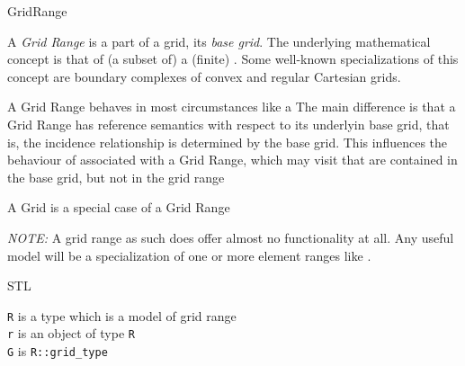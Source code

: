 \begin{Label}{GridRange}  
\end{Label}

    A {\em  Grid Range} is a part of a grid, its {\em  base grid}.
    The underlying mathematical concept
    is that of (a subset of) a (finite) 
    .
    Some well-known specializations of this concept are
    boundary complexes of convex 
    and regular Cartesian grids.

    A Grid Range behaves in most circumstances like a 
    The main difference is that a Grid Range has reference semantics with respect to
    its underlyin base grid, that is, the incidence relationship is determined by the 
    base grid.
    This influences the behaviour of
    associated with a Grid Range,
    which may  visit 
    that are contained in the base grid,
    but not  in the grid range    
    
    A Grid is a special case of a Grid 
    Range  %

    {\em  NOTE:} A grid range as such does offer almost no functionality at all.
    Any useful model will be a specialization of one or more 
    element ranges 
    like     
    .

     STL 


    {\tt  R} is a type which is a model of grid range
    \\
    {\tt  r} is an object of type {\tt  R}
    \\
    {\tt G} is {\tt R::grid\_type}


